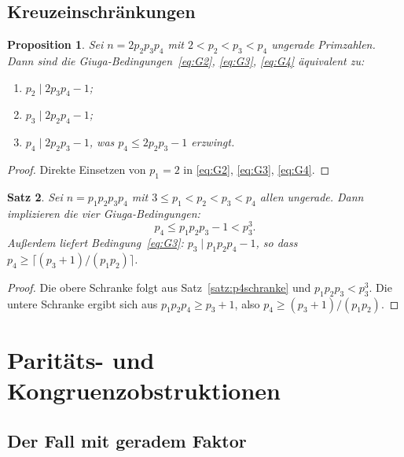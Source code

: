 \documentclass[12pt,a4paper]{amsart}
\newtheorem{theorem}{Satz}[section]
\newtheorem{proposition}[theorem]{Proposition}
\theoremstyle{definition}
\begin{document}
\subsection{Kreuzeinschränkungen}

\begin{proposition}
\label{prop:kreuz}
Sei $n = 2 p_2 p_3 p_4$ mit $2 < p_2 < p_3 < p_4$ ungerade Primzahlen.
Dann sind die Giuga-Bedingungen~\eqref{eq:G2}, \eqref{eq:G3}, \eqref{eq:G4}
äquivalent zu:
\begin{enumerate}[label=\textup{(\alph*)}]
  \item $p_2 \mid 2 p_3 p_4 - 1$;
  \item $p_3 \mid 2 p_2 p_4 - 1$;
  \item $p_4 \mid 2 p_2 p_3 - 1$, was $p_4 \le 2 p_2 p_3 - 1$ erzwingt.
\end{enumerate}
\end{proposition}

\begin{proof}
Direkte Einsetzen von $p_1 = 2$ in \eqref{eq:G2}, \eqref{eq:G3}, \eqref{eq:G4}.
\end{proof}

\begin{theorem}
\label{satz:allungerade}
Sei $n = p_1 p_2 p_3 p_4$ mit $3 \le p_1 < p_2 < p_3 < p_4$ allen ungerade.
Dann implizieren die vier Giuga-Bedingungen:
\[
  p_4 \le p_1 p_2 p_3 - 1 < p_3^3.
\]
Außerdem liefert Bedingung~\eqref{eq:G3}: $p_3 \mid p_1 p_2 p_4 - 1$, so
dass $p_4 \ge \lceil(p_3 + 1)/(p_1 p_2)\rceil$.
\end{theorem}

\begin{proof}
Die obere Schranke folgt aus Satz~\ref{satz:p4schranke} und
$p_1 p_2 p_3 < p_3^3$.  Die untere Schranke ergibt sich aus
$p_1 p_2 p_4 \ge p_3 + 1$, also $p_4 \ge (p_3 + 1)/(p_1 p_2)$.
\end{proof}

\section{Paritäts- und Kongruenzobstruktionen}
\label{sec:paritaet}

\subsection{Der Fall mit geradem Faktor}
\end{document}
